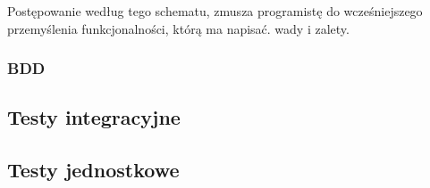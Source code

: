     Postępowanie według tego schematu, zmusza programistę do wcześniejszego przemyślenia funkcjonalności, którą ma napisać.
    wady i zalety.


    \subsubsection{BDD}

  \subsection{Testy integracyjne}
  \subsection{Testy jednostkowe}
